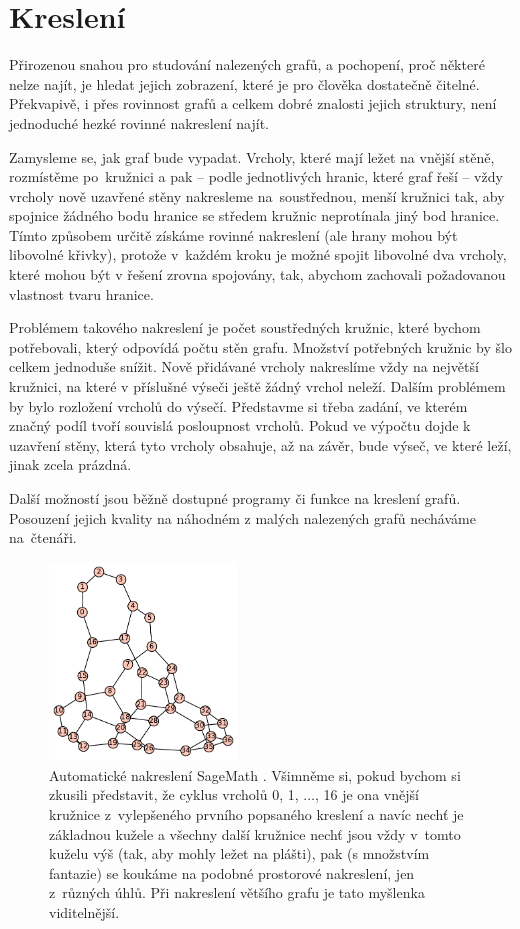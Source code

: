 
\chapter{Kreslení} \label{kresleni}

Přirozenou snahou pro studování nalezených grafů, a pochopení, proč některé nelze najít, je hledat jejich zobrazení, které je pro člověka dostatečně čitelné. Překvapivě, i přes rovinnost grafů a celkem dobré znalosti jejich struktury, není jednoduché hezké rovinné nakreslení najít.

Zamysleme se, jak graf bude vypadat. Vrcholy, které mají ležet na vnější stěně, rozmístěme po~kružnici a pak -- podle jednotlivých hranic, které graf řeší -- vždy vrcholy nově uzavřené stěny nakresleme na~soustřednou, menší kružnici tak, aby spojnice žádného bodu hranice se středem kružnic neprotínala jiný bod hranice. Tímto způsobem určitě získáme rovinné nakreslení (ale hrany mohou být libovolné křivky), protože v~každém kroku je možné spojit libovolné dva vrcholy, které mohou být v řešení zrovna spojovány, tak, abychom zachovali požadovanou vlastnost tvaru hranice.

Problémem takového nakreslení je počet soustředných kružnic, které bychom potřebovali, který odpovídá počtu stěn grafu. Množství potřebných kružnic by šlo celkem jednoduše snížit. Nově přidávané vrcholy nakreslíme vždy na největší kružnici, na které v příslušné výseči ještě žádný vrchol neleží. Dalším problémem by bylo rozložení vrcholů do výsečí. Představme si třeba zadání, ve kterém značný podíl tvoří souvislá posloupnost  vrcholů. Pokud ve výpočtu dojde k uzavření stěny, která tyto vrcholy obsahuje, až na závěr, bude výseč, ve které leží, jinak zcela prázdná.

Další možností jsou běžně dostupné programy či funkce na kreslení grafů. Posouzení jejich kvality na náhodném z malých nalezených grafů necháváme na~čtenáři.


\begin{figure}[h]\centering
\includegraphics[width = 50mm]{../img/sageplot}
\caption{Automatické nakreslení SageMath \cite{sagemath}. Všimněme si, pokud bychom si zkusili představit, že cyklus vrcholů 0, 1, $\dots$, 16 je ona vnější kružnice z~vylepšeného prvního popsaného kreslení a navíc nechť je základnou kužele a všechny další kružnice nechť jsou vždy v~tomto kuželu výš (tak, aby mohly ležet na plášti), pak (s množstvím fantazie) se koukáme na podobné prostorové nakreslení, jen z~různých úhlů. Při nakreslení většího grafu je tato myšlenka viditelnější.}
\label{obr:sageplot}
\end{figure}


